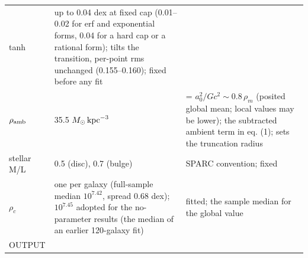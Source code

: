 \documentclass[
  10pt,
]{article}
\begin{document}
\begin{longtable}[]{@{}lll@{}}
\begin{minipage}[t]{0.20\columnwidth}
tanh\strut
\end{minipage} & \begin{minipage}[t]{0.50\columnwidth}\raggedright
up to 0.04 dex at fixed cap (0.01--0.02 for erf and exponential forms, 0.04 for a hard cap or a rational form); tilts the transition, per-point rms unchanged (0.155--0.160); fixed before any fit\strut
\end{minipage}\tabularnewline
\begin{minipage}[t]{0.24\columnwidth}\raggedright
$\rho_{\rm amb}$\strut
\end{minipage} & \begin{minipage}[t]{0.20\columnwidth}\raggedright
35.5 $M_\odot\,{\rm kpc}^{-3}$\strut
\end{minipage} & \begin{minipage}[t]{0.50\columnwidth}\raggedright
= $a_0^2/Gc^2\sim 0.8\,\rho_m$ (posited global mean; local values may be lower); the subtracted ambient
term in eq. (1); sets the truncation radius\strut
\end{minipage}\tabularnewline
\begin{minipage}[t]{0.24\columnwidth}\raggedright
stellar M/L\strut
\end{minipage} & \begin{minipage}[t]{0.20\columnwidth}\raggedright
0.5 (disc), 0.7 (bulge)\strut
\end{minipage} & \begin{minipage}[t]{0.50\columnwidth}\raggedright
SPARC convention; fixed\strut
\end{minipage}\tabularnewline
\begin{minipage}[t]{0.24\columnwidth}\raggedright
$\rho_c$\strut
\end{minipage} & \begin{minipage}[t]{0.20\columnwidth}\raggedright
one per galaxy (full-sample median $10^{7.42}$, spread 0.68 dex); $10^{7.45}$ adopted for the no-parameter
results (the median of an earlier 120-galaxy fit)\strut
\end{minipage} & \begin{minipage}[t]{0.50\columnwidth}\raggedright
fitted; the sample median for the global value\strut
\end{minipage}\tabularnewline
\begin{minipage}[t]{0.24\columnwidth}\raggedright
OUTPUT\strut
\end{minipage} & \begin{minipage}[t]{0.20\columnwidth}\raggedright
\strut
\end{minipage} & \begin{minipage}[t]{0.50\columnwidth}\raggedright

\end{minipage}
\end{longtable}
\end{document}
